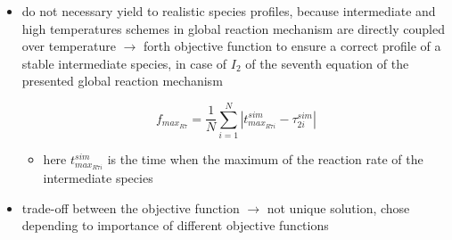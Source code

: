 \documentclass[12pt,oneside,a4paper,english]{article}
\begin{document}
\begin{itemize}
\item{do not necessary yield to realistic species profiles, because intermediate and high temperatures schemes in global reaction mechanism are directly coupled over temperature $\rightarrow$ forth objective function to ensure a correct profile of a stable intermediate species, in case of \cite{vandersickel2013} $I_2$ of the seventh equation of the presented global reaction mechanism}

\begin{equation}
f_{max_{R7}} = \frac{1}{N} \sum_{i=1}^{N} |t_{max_{R7i}}^{sim}-\tau_{2i}^{sim}|
\end{equation}

	\begin{itemize}
	\item{here $t_{max_{R7i}}^{sim}$ is the time when the maximum of the reaction rate of the intermediate species}
	\end{itemize}
	
\item{trade-off between the objective function $\rightarrow$ not unique solution, chose depending to importance of different objective functions} \\
\end{itemize}
\end{document}
